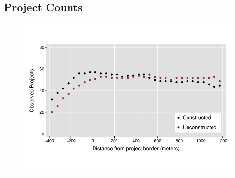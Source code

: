 \documentclass[12pt]{article}
\begin{document}
\pagebreak
\subsection{Project Counts}
\vspace{-5mm}
\begin{figure}[h!]
\centering
\includegraphics[scale=1.2,trim={.2cm 1.2cm .2cm 1.2cm},clip]{figures/projectcounts.pdf}
\end{figure}
\end{document}
